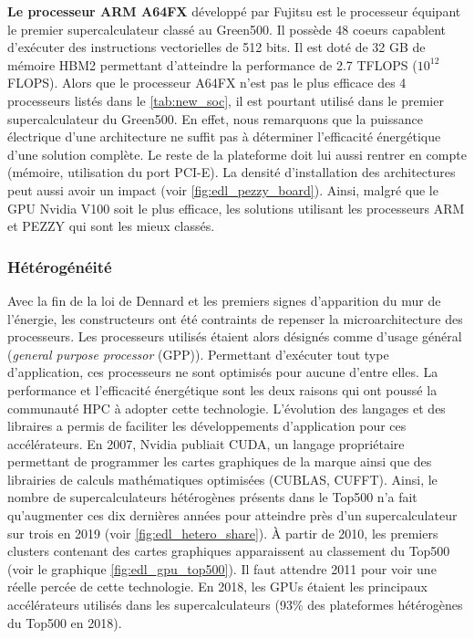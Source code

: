         \textbf{Le processeur ARM A64FX} développé par Fujitsu est le processeur équipant le premier supercalculateur classé au Green500. Il possède 48 coeurs capablent d'exécuter des instructions vectorielles de 512 bits. Il est doté de 32 GB de mémoire HBM2 permettant d'atteindre la performance de 2.7 TFLOPS ($10^{12}$ \gls{FLOPS}). Alors que le processeur A64FX n'est pas le plus efficace des 4 processeurs listés dans le \autoref{tab:new_soc}, il est pourtant utilisé dans le premier supercalculateur du Green500. En effet, nous remarquons que la puissance électrique d'une architecture ne suffit pas à déterminer l'efficacité énergétique d'une solution complète. Le reste de la plateforme doit lui aussi rentrer en compte (mémoire, utilisation du port PCI-E). La densité d'installation des architectures peut aussi avoir un impact (voir \autoref{fig:edl_pezzy_board}). Ainsi, malgré que le GPU Nvidia V100 soit le plus efficace, les solutions utilisant les processeurs ARM et PEZZY qui sont les mieux classés.
        
    \subsubsection{Hétérogénéité} \label{sec:edl_hpc_hetero}
        
        Avec la fin de la loi de Dennard et les premiers signes d'apparition du mur de l'énergie, les constructeurs ont été contraints de repenser la microarchitecture des processeurs. Les processeurs utilisés étaient alors désignés comme d'usage général (\textit{general purpose processor} (GPP)). Permettant d'exécuter tout type d'application, ces processeurs ne sont optimisés pour aucune d'entre elles. 
        La performance et l'efficacité énergétique sont les deux raisons qui ont poussé la communauté HPC à adopter cette technologie. L'évolution des langages et des libraires a permis de faciliter les développements d'application pour ces accélérateurs. En 2007, Nvidia publiait CUDA, un langage propriétaire permettant de programmer les cartes graphiques de la marque ainsi que des librairies de calculs mathématiques optimisées (CUBLAS, CUFFT). Ainsi, le nombre de supercalculateurs hétérogènes présents dans le Top500 n'a fait qu'augmenter ces dix dernières années pour atteindre près d'un supercalculateur sur trois en 2019 (voir \autoref{fig:edl_hetero_share}). À partir de 2010, les premiers clusters contenant des cartes graphiques apparaissent au classement du Top500 (voir le graphique \ref{fig:edl_gpu_top500}). Il faut attendre 2011 pour voir une réelle percée de cette technologie. En 2018, les GPUs étaient les principaux accélérateurs utilisés dans les supercalculateurs (93\% des plateformes hétérogènes du Top500 en 2018). 
        
